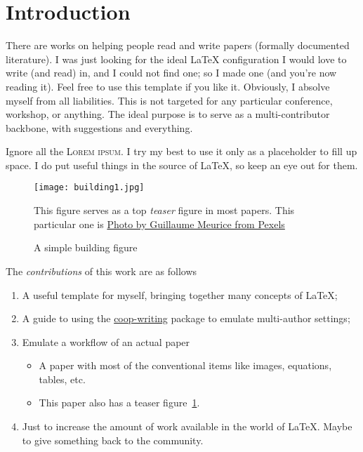 \section{Introduction}

There are works on helping people read \cite{keshav2007read} and write \cite{hall2008write, zobel2004writing} papers (formally documented literature).
I was just looking for the ideal LaTeX configuration I would love to write (and read) in, and I could not find one; so I made one (and you're now reading it). Feel free to use this template if you like it. Obviously, I absolve myself from all liabilities. This is not targeted for any particular conference, workshop, or anything. The ideal purpose is to serve as a multi-contributor backbone, with suggestions and everything. 

Ignore all the \textsc{Lorem ipsum}. I try my best to use it only as a placeholder to fill up space. I do put useful things in the source of \LaTeX, so keep an eye out for them.

\begin{figure}[t]
    \centering
    \texttt{[image: building1.jpg]}
    \caption{A simple building figure}
    \label{fig:building}
    \small
        This figure serves as a top \emph{teaser} figure in most papers. This particular one is \href{https://www.pexels.com/photo/high-rise-orange-and-white-building-2739074/}{Photo by Guillaume Meurice from Pexels}
\end{figure}

\lipsum[1]

The \emph{contributions} of this work are as follows

\begin{enumerate}
    \item A useful template for myself, bringing together many concepts of \LaTeX;
    \item A guide to using the \href{https://www.ctan.org/pkg/coop-writing}{coop-writing} package to emulate multi-author settings;
    \item Emulate a workflow of an actual paper
    \begin{itemize}
        \item A paper with most of the conventional items like images, equations, tables, etc.
        \item This paper also has a teaser figure~\ref{fig:building}.
    \end{itemize}
    \item Just to increase the amount of work available in the world of \LaTeX. Maybe to give something back to the community.
\end{enumerate}
